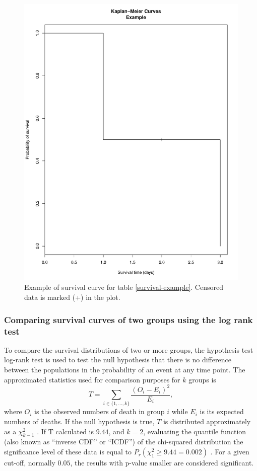\begin{figure}
\centering
\includegraphics[width=0.5\linewidth,hight=4cm]{images/example_survival.pdf}
\caption[Example of survival curve.]{
Example of survival curve for table \ref{survival-example}. Censored data is marked (+) in the plot.}
\end{figure}




\subsubsection{Comparing survival curves of two groups using the log rank test}

 To compare the survival distributions of two or more groups,  the hypothesis test log-rank test is
 used to test the null hypothesis that there is no difference between the populations
 in the probability of an event at any time point.
%
 The approximated statistics used for comparison purposes for $k$ groups is
 $$T = \sum_{i \in \{1,\ldots,k\}}\frac{(O_i - E_i)^2}{E_i},$$
 where $O_i$ is the observed numbers of death in  group $i$
 while $E_i$ is its expected numbers of deaths.
 If the null hypothesis is true, $T$ is distributed approximately as a $\chi^2_{k-1}$ \cite{matthews1996using}.
If T calculated is $9.44$, and $k = 2$,  evaluating the quantile function (also known as “inverse CDF” or “ICDF”) of the chi-squared distribution the significance level of these data is equal to
$P_r(\chi^2_{1}\geq9.44 = 0.002)$ \cite{yau2012r}.
For a given cut-off, normally $0.05$, the results with p-value smaller are considered significant.

